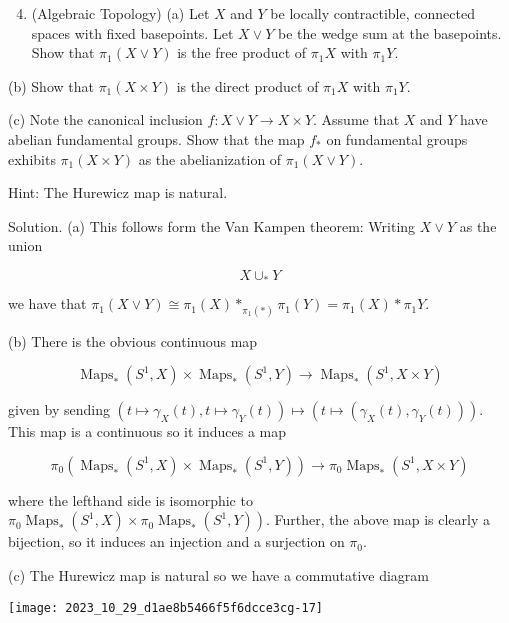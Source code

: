 \documentclass[10pt]{article}
\begin{document}
\begin{enumerate}
  \setcounter{enumi}{3}
  \item (Algebraic Topology) (a) Let $X$ and $Y$ be locally contractible, connected spaces with fixed basepoints. Let $X \vee Y$ be the wedge sum at the basepoints. Show that $\pi_{1}(X \vee Y)$ is the free product of $\pi_{1} X$ with $\pi_{1} Y$.
\end{enumerate}

(b) Show that $\pi_{1}(X \times Y)$ is the direct product of $\pi_{1} X$ with $\pi_{1} Y$.

(c) Note the canonical inclusion $f: X \vee Y \rightarrow X \times Y$. Assume that $X$ and $Y$ have abelian fundamental groups. Show that the map $f_{*}$ on fundamental groups exhibits $\pi_{1}(X \times Y)$ as the abelianization of $\pi_{1}(X \vee Y)$.

Hint: The Hurewicz map is natural.

Solution. (a) This follows form the Van Kampen theorem: Writing $X \vee Y$ as the union

$$
X \cup_{*} Y
$$

we have that $\pi_{1}(X \vee Y) \cong \pi_{1}(X) *_{\pi_{1}(*)} \pi_{1}(Y)=\pi_{1}(X) * \pi_{1} Y$.

(b) There is the obvious continuous map

$$
\operatorname{Maps}_{*}\left(S^{1}, X\right) \times \operatorname{Maps}_{*}\left(S^{1}, Y\right) \rightarrow \operatorname{Maps}_{*}\left(S^{1}, X \times Y\right)
$$

given by sending $\left(t \mapsto \gamma_{X}(t), t \mapsto \gamma_{Y}(t)\right) \mapsto\left(t \mapsto\left(\gamma_{X}(t), \gamma_{Y}(t)\right)\right)$. This map is a continuous so it induces a map

$$
\pi_{0}\left(\operatorname{Maps}_{*}\left(S^{1}, X\right) \times \operatorname{Maps}_{*}\left(S^{1}, Y\right)\right) \rightarrow \pi_{0} \operatorname{Maps}_{*}\left(S^{1}, X \times Y\right)
$$

where the lefthand side is isomorphic to $\left.\pi_{0} \operatorname{Maps}_{*}\left(S^{1}, X\right) \times \pi_{0} \operatorname{Maps}_{*}\left(S^{1}, Y\right)\right)$. Further, the above map is clearly a bijection, so it induces an injection and a surjection on $\pi_{0}$.

(c) The Hurewicz map is natural so we have a commutative diagram

\begin{center}
\texttt{[image: 2023\_10\_29\_d1ae8b5466f5f6dcce3cg-17]}
\end{center}
\end{document}
